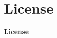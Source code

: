 \documentclass[hidelinks,aspectratio=169]{beamer}
\begin{document}
\section{\textbf{License}}
\begin{frame}{\textbf{License}}
	\begin{center}
		\doclicenseThis
	\end{center}
\end{frame}
	
	
\end{document}
